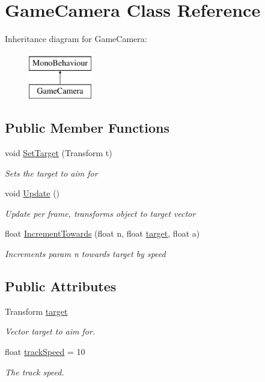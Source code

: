 \hypertarget{classGameCamera}{\section{Game\-Camera Class Reference}
\label{classGameCamera}
}
Inheritance diagram for Game\-Camera\-:\begin{figure}[H]
\begin{center}
\leavevmode
\includegraphics[height=2.000000cm]{classGameCamera}
\end{center}
\end{figure}
\subsection*{Public Member Functions}
\begin{DoxyCompactItemize}
\item 
void \hyperlink{classGameCamera_adb2bfc4c2738e33d9b98bc97fddacb4e}{Set\-Target} (Transform t)
\begin{DoxyCompactList}\small\item\em Sets the target to aim for \end{DoxyCompactList}\item 
void \hyperlink{classGameCamera_aa6ef15e6deb0f8921cdb93c9ad719ca0}{Update} ()
\begin{DoxyCompactList}\small\item\em Update per frame, transforms object to target vector \end{DoxyCompactList}\item 
float \hyperlink{classGameCamera_adb57e107c5ac3c860c1d31589453c9a4}{Increment\-Towards} (float n, float \hyperlink{classGameCamera_a952c82b1dd2710a4af6fe0fbeaca776c}{target}, float a)
\begin{DoxyCompactList}\small\item\em Increments param n towards target by speed \end{DoxyCompactList}\end{DoxyCompactItemize}
\subsection*{Public Attributes}
\begin{DoxyCompactItemize}
\item 
Transform \hyperlink{classGameCamera_a952c82b1dd2710a4af6fe0fbeaca776c}{target}
\begin{DoxyCompactList}\small\item\em Vector target to aim for. \end{DoxyCompactList}\item 
float \hyperlink{classGameCamera_af9039782e227fc39fa15528908e37137}{track\-Speed} = 10
\begin{DoxyCompactList}\small\item\em The track speed. \end{DoxyCompactList}\end{DoxyCompactItemize}


